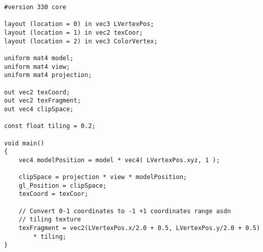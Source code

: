 \begin{lstlisting}[style=glsl]
#version 330 core

layout (location = 0) in vec3 LVertexPos;
layout (location = 1) in vec2 texCoor;
layout (location = 2) in vec3 ColorVertex;

uniform mat4 model;
uniform mat4 view;
uniform mat4 projection;

out vec2 texCoord;
out	vec2 texFragment;
out	vec4 clipSpace;

const float tiling = 0.2;

void main()
{
	vec4 modelPosition = model * vec4( LVertexPos.xyz, 1 );

	clipSpace = projection * view * modelPosition;
	gl_Position = clipSpace;
	texCoord = texCoor;
	
	// Convert 0-1 coordinates to -1 +1 coordinates range asdn
	// tiling texture
	texFragment = vec2(LVertexPos.x/2.0 + 0.5, LVertexPos.y/2.0 + 0.5)
		* tiling;
}
\end{lstlisting}